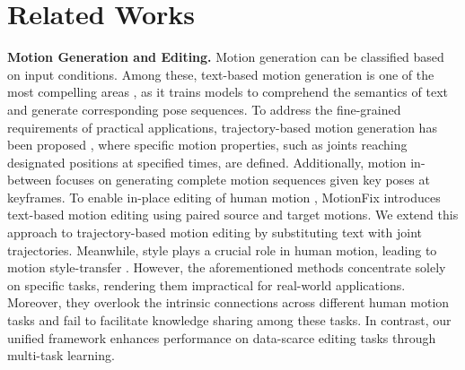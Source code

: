 \section{Related Works}

\textbf{Motion Generation and Editing.} Motion generation can be classified based on input conditions. Among these, text-based motion generation is one of the most compelling areas \cite{zhang2022motiondiffuse,tevet2022motionclip,tevet2023human,Guo_2022_CVPR,chen2023executing,guo2024momask,guo2022tm2t,wang2024motiongpt,jiang2023motiongpt,kim2023flame,lin2023motion,lu2023humantomato,plappert2016kit,zhang2023generating,guo2020action2motion,petrovich2021action}, as it trains models to comprehend the semantics of text and generate corresponding pose sequences. To address the fine-grained requirements of practical applications, trajectory-based motion generation has been proposed \cite{karunratanakul2023guided,shafir2023human,xie2023omnicontrol,dai2025motionlcm,zhang2023finemogen}, where specific motion properties, such as joints reaching designated positions at specified times, are defined. Additionally, motion in-between \cite{tevet2023human,jiang2023motiongpt,cohan2024flexible,qin2022motion,pinyoanuntapong2024mmm} focuses on generating complete motion sequences given key poses at keyframes. To enable in-place editing of human motion \cite{goel2024iterative,athanasiou2024motionfix}, MotionFix \cite{athanasiou2024motionfix} introduces text-based motion editing using paired source and target motions. We extend this approach to trajectory-based motion editing by substituting text with joint trajectories. Meanwhile, style plays a crucial role in human motion, leading to motion style-transfer \cite{jang2022motion,aberman2020unpaired,zhong2025smoodi,Song_2024_CVPR}. However, the aforementioned methods concentrate solely on specific tasks, rendering them impractical for real-world applications. Moreover, they overlook the intrinsic connections across different human motion tasks and fail to facilitate knowledge sharing among these tasks. In contrast, our unified framework enhances performance on data-scarce editing tasks through multi-task learning.

